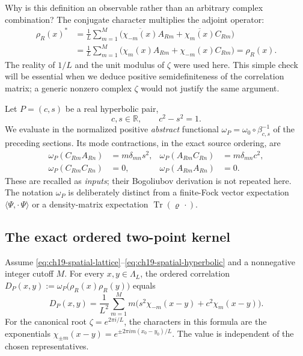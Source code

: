 Why is this definition an observable rather than an arbitrary complex
combination?  The conjugate character multiplies the adjoint operator:
\begin{align*}
 \rho_R(x)^*
 &=\frac1L\sum_{m=1}^{M}
   \bigl(\overline{\chi_{-m}(x)}A_{Rm}
        +\overline{\chi_m(x)}C_{Rm}\bigr)\\
 &=\frac1L\sum_{m=1}^{M}
   \bigl(\chi_m(x)A_{Rm}+\chi_{-m}(x)C_{Rm}\bigr)
 =\rho_R(x).
\end{align*}
The reality of $1/L$ and the unit modulus of $\zeta$ were used here.
This simple check will be essential when we deduce positive
semidefiniteness of the correlation matrix; a generic nonzero
complex $\zeta$ would not justify the same argument.

Let $P=(c,s)$ be a real hyperbolic pair,
\begin{equation}
 c,s\in\mathbb R,\qquad c^2-s^2=1.
 \label{eq:ch19-spatial-hyperbolic}
\end{equation}
We evaluate in the normalized positive \emph{abstract} functional
$\omega_P=\omega_0\circ\beta_{c,s}^{-1}$ of the preceding sections.
Its mode contractions, in the exact source ordering, are
\begin{align}
 \omega_P(C_{Rm}A_{Rn})&=m\delta_{mn}s^2,
 &\omega_P(A_{Rm}C_{Rn})&=m\delta_{mn}c^2,
 \label{eq:ch19-spatial-input-contractions}\\
 \omega_P(C_{Rm}C_{Rn})&=0,
 &\omega_P(A_{Rm}A_{Rn})&=0.
 \label{eq:ch19-spatial-input-zeros}
\end{align}
These are recalled as \emph{inputs}; their Bogoliubov derivation is not
repeated here.  The notation $\omega_P$ is deliberately distinct from
a finite-Fock vector expectation $\langle\Psi,\cdot\,\Psi\rangle$
or a density-matrix expectation $\operatorname{Tr}(\varrho\,\cdot)$.

\subsection{The exact ordered two-point kernel}

\begin{theorem}
\label{thm:ch19-spatial-ordered}
Assume \eqref{eq:ch19-spatial-lattice}--\eqref{eq:ch19-spatial-hyperbolic}
and a nonnegative integer cutoff $M$.  For every $x,y\in\Lambda_L$,
the ordered correlation
$D_P(x,y):=\omega_P\bigl(\rho_R(x)\rho_R(y)\bigr)$ equals
\begin{equation}
 \boxed{\displaystyle
 D_P(x,y)=\frac1{L^2}\sum_{m=1}^{M}m
 \bigl(s^2\chi_{-m}(x-y)+c^2\chi_m(x-y)\bigr).}
 \label{eq:ch19-spatial-ordered}
\end{equation}
For the canonical root $\zeta=e^{2\pi i/L}$, the characters
in this formula are the exponentials
$\chi_{\pm m}(x-y)=e^{\pm2\pi i m(x_0-y_0)/L}$.
The value is independent of the chosen representatives.
\end{theorem}

